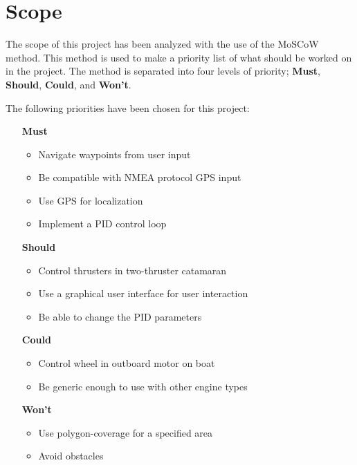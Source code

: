 \newpage
\chapter{Scope}
The scope of this project has been analyzed with the use of the MoSCoW method\cite{moscow}. This method is used to make a priority list of what should be worked on in the project. The method is separated into four levels of priority; \textbf{Must}, \textbf{Should}, \textbf{Could}, and \textbf{Won't}.

\noindent The following priorities have been chosen for this project:
\begin{itemize}
	\item[\textbf{Must}]
		\begin{itemize}
			\item Navigate waypoints from user input
			\item Be compatible with NMEA protocol GPS input
			\item Use GPS for localization
			\item Implement a PID control loop
		\end{itemize}
	\item[\textbf{Should}]
		\begin{itemize}
			\item Control thrusters in two-thruster catamaran
			\item Use a graphical user interface for user interaction
			\item Be able to change the PID parameters
		\end{itemize}
	\item[\textbf{Could}] 
		\begin{itemize}
			\item Control wheel in outboard motor on boat
			\item Be generic enough to use with other engine types
		\end{itemize}
	\item[\textbf{Won't}]
		\begin{itemize}
			\item Use polygon-coverage for a specified area
			\item Avoid obstacles
		\end{itemize}
\end{itemize}